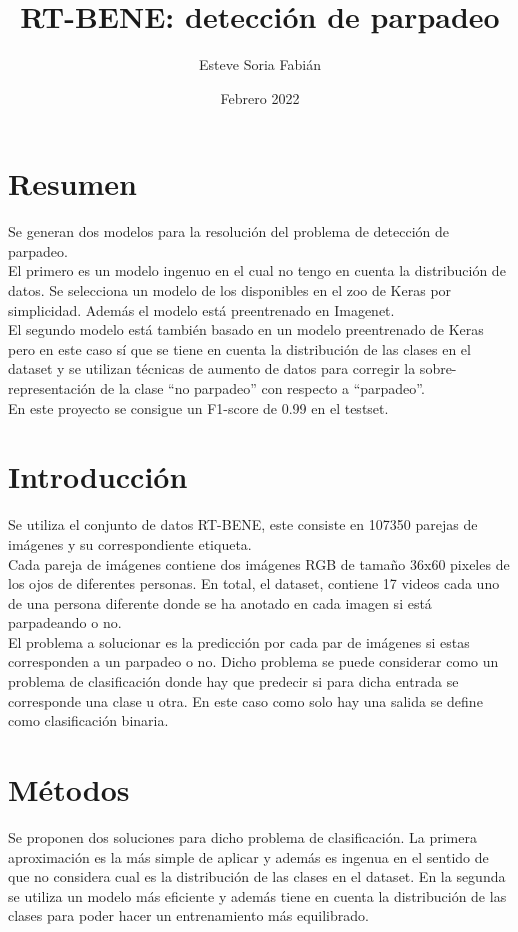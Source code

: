 \documentclass[12pt]{article}
\title{RT-BENE: detección de parpadeo}
\author{Esteve Soria Fabián}
\date{Febrero 2022}
\begin{document}
    \maketitle
    \newpage


    \section{Resumen}
    Se generan dos modelos para la resolución del problema de detección de parpadeo.\\
    El primero es un modelo ingenuo en el cual no tengo en cuenta la distribución de datos.
    Se selecciona un modelo de los disponibles en el zoo de Keras por simplicidad.
    Además el modelo está preentrenado en Imagenet.\\
    El segundo modelo está también basado en un modelo preentrenado de Keras pero en este caso sí que se tiene en
    cuenta la distribución de las clases en el dataset y se utilizan técnicas de aumento de datos para corregir la
    sobre-representación de la clase “no parpadeo” con respecto a “parpadeo”.\\
    En este proyecto se consigue un F1-score de 0.99 en el testset.


    \section{Introducción}

    Se utiliza el conjunto de datos RT-BENE, este consiste en 107350 parejas de imágenes y su correspondiente
    etiqueta.\\
    Cada pareja de imágenes contiene dos imágenes RGB de tamaño 36x60 pixeles de los ojos de diferentes personas.
    En total, el dataset, contiene 17 videos cada uno de una persona diferente donde se ha anotado en cada imagen si
    está parpadeando o no.\\
    El problema a solucionar es la predicción por cada par de imágenes si estas corresponden a un parpadeo o no.
    Dicho problema se puede considerar como un problema de clasificación donde hay que predecir si para dicha entrada
    se corresponde una clase u otra.
    En este caso como solo hay una salida se define como clasificación binaria.


    \section{Métodos}
    Se proponen dos soluciones para dicho problema de clasificación.
    La primera aproximación es la más simple de aplicar y además es ingenua en el sentido de que no considera cual es
    la distribución de las clases en el dataset.
    En la segunda se utiliza un modelo más eficiente y además tiene en cuenta la distribución de las clases para
    poder hacer un entrenamiento más equilibrado.
\end{document}
